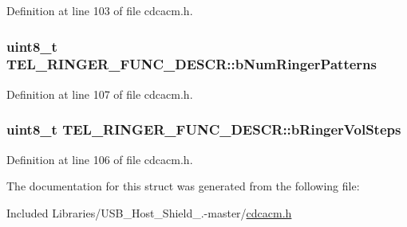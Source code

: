 \-Definition at line 103 of file cdcacm.\-h.

\hypertarget{struct_t_e_l___r_i_n_g_e_r___f_u_n_c___d_e_s_c_r_aca65dc577a0dbc13972da9ab26e25918}{
\subsubsection[{b\-Num\-Ringer\-Patterns}]{\setlength{\rightskip}{0pt plus 5cm}uint8\-\_\-t {\bf \-T\-E\-L\-\_\-\-R\-I\-N\-G\-E\-R\-\_\-\-F\-U\-N\-C\-\_\-\-D\-E\-S\-C\-R\-::b\-Num\-Ringer\-Patterns}}}\label{struct_t_e_l___r_i_n_g_e_r___f_u_n_c___d_e_s_c_r_aca65dc577a0dbc13972da9ab26e25918}


\-Definition at line 107 of file cdcacm.\-h.

\hypertarget{struct_t_e_l___r_i_n_g_e_r___f_u_n_c___d_e_s_c_r_afdbb7ff1b60803569e26718685da9196}{
\subsubsection[{b\-Ringer\-Vol\-Steps}]{\setlength{\rightskip}{0pt plus 5cm}uint8\-\_\-t {\bf \-T\-E\-L\-\_\-\-R\-I\-N\-G\-E\-R\-\_\-\-F\-U\-N\-C\-\_\-\-D\-E\-S\-C\-R\-::b\-Ringer\-Vol\-Steps}}}\label{struct_t_e_l___r_i_n_g_e_r___f_u_n_c___d_e_s_c_r_afdbb7ff1b60803569e26718685da9196}


\-Definition at line 106 of file cdcacm.\-h.



\-The documentation for this struct was generated from the following file\-:\begin{DoxyCompactItemize}
\item 
\-Included Libraries/\-U\-S\-B\-\_\-\-Host\-\_\-\-Shield\-\_.-\/master/\hyperlink{cdcacm_8h}{cdcacm.\-h}\end{DoxyCompactItemize}
